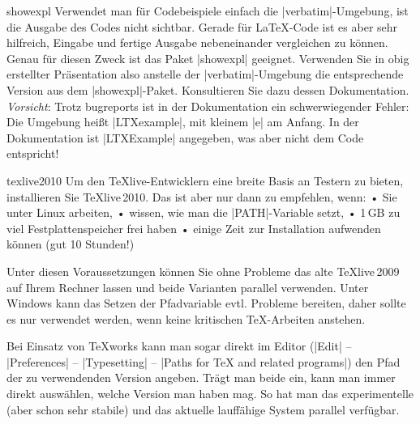 \documentclass[
	blatt=8,
	ausgabe=06.\,06.\,2010,
	rückgabe=11.\,06.\,2010
]{lcourse-hd}
\begin{document}
\begin{expertexercise}[
  name={Codebeispiele advanced},
  abgabe = Integriert in die Abgabe des obigen Dokumentes.]{showexpl}
Verwendet man für Codebeispiele einfach die |verbatim|-Umgebung, ist die Ausgabe des Codes nicht sichtbar. Gerade für \LaTeX-Code ist es aber sehr hilfreich, Eingabe und fertige Ausgabe nebeneinander vergleichen zu können. Genau für diesen Zweck ist das Paket |showexpl| geeignet. Verwenden Sie in obig erstellter Präsentation also anstelle der |verbatim|-Umgebung die entsprechende Version aus dem |showexpl|-Paket. Konsultieren Sie dazu dessen Dokumentation.
\\

\emph{Vorsicht}: Trotz bugreports ist in der Dokumentation ein schwerwiegender Fehler: Die Umgebung heißt |LTXexample|, mit kleinem |e| am Anfang. In der Dokumentation ist |LTXExample| angegeben, was aber nicht dem Code entspricht!
\end{expertexercise}

\begin{expertexercise}[
  name={\TeX live2010},
  abgabe = keine Abgabe nötig]{texlive2010}
Um den \TeX live-Entwicklern eine breite Basis an Testern zu bieten, installieren Sie \TeX live\,2010. Das ist aber nur dann zu empfehlen, wenn:
• Sie unter Linux arbeiten,
• wissen, wie man die |PATH|-Variable setzt,
• 1\,GB zu viel Festplattenspeicher frei haben
• einige Zeit zur Installation aufwenden können (gut 10 Stunden!)

Unter diesen Voraussetzungen können Sie ohne Probleme das alte \TeX live\,2009 auf Ihrem Rechner lassen und beide Varianten parallel verwenden. Unter Windows kann das Setzen der Pfadvariable evtl. Probleme bereiten, daher sollte es nur verwendet werden, wenn keine kritischen \TeX-Arbeiten anstehen.

Bei Einsatz von \TeX works kann man sogar direkt im Editor (|Edit| – |Preferences| – |Typesetting| – |Paths for TeX and related programs|) den Pfad der zu verwendenden Version angeben. Trägt man beide ein, kann man immer direkt auswählen, welche Version man haben mag. So hat man das experimentelle (aber schon sehr stabile) und das aktuelle lauffähige System parallel verfügbar.

\end{expertexercise}
\end{document}
